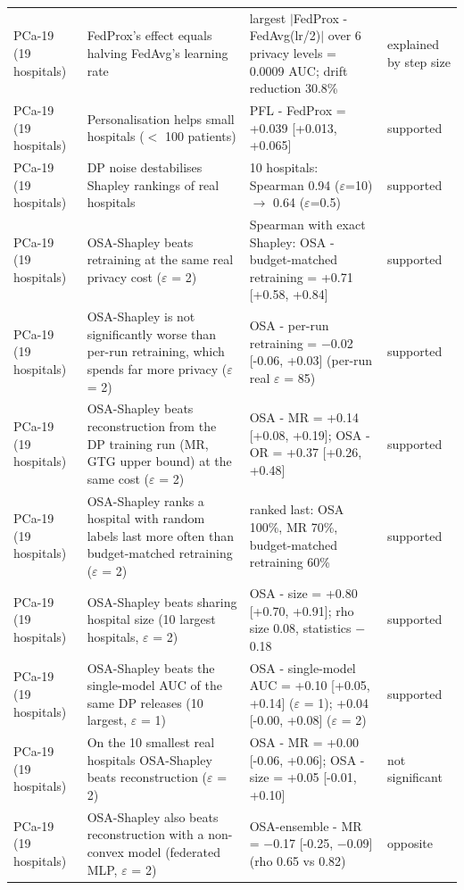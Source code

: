 \begin{table}[t]
\begin{tabular}{p{1.4cm}p{4.2cm}p{8.6cm}p{1.5cm}}
PCa-19 (19 hospitals) & FedProx's effect equals halving FedAvg's learning rate & largest $|$FedProx - FedAvg(lr/2)$|$ over 6 privacy levels = 0.0009 AUC; drift reduction 30.8\% & explained by step size \\
PCa-19 (19 hospitals) & Personalisation helps small hospitals ($<$ 100 patients) & PFL - FedProx = +0.039 {[}+0.013, +0.065{]} & supported \\
PCa-19 (19 hospitals) & DP noise destabilises Shapley rankings of real hospitals & 10 hospitals: Spearman 0.94 ($\varepsilon$=10) $\rightarrow$ 0.64 ($\varepsilon$=0.5) & supported \\
PCa-19 (19 hospitals) & OSA-Shapley beats retraining at the same real privacy cost ($\varepsilon$ = 2) & Spearman with exact Shapley: OSA - budget-matched retraining = +0.71 {[}+0.58, +0.84{]} & supported \\
PCa-19 (19 hospitals) & OSA-Shapley is not significantly worse than per-run retraining, which spends far more privacy ($\varepsilon$ = 2) & OSA - per-run retraining = \ensuremath{-}0.02 {[}-0.06, +0.03{]} (per-run real $\varepsilon$ = 85) & supported \\
PCa-19 (19 hospitals) & OSA-Shapley beats reconstruction from the DP training run (MR, GTG upper bound) at the same cost ($\varepsilon$ = 2) & OSA - MR = +0.14 {[}+0.08, +0.19{]}; OSA - OR = +0.37 {[}+0.26, +0.48{]} & supported \\
PCa-19 (19 hospitals) & OSA-Shapley ranks a hospital with random labels last more often than budget-matched retraining ($\varepsilon$ = 2) & ranked last: OSA 100\%, MR 70\%, budget-matched retraining 60\% & supported \\
PCa-19 (19 hospitals) & OSA-Shapley beats sharing hospital size (10 largest hospitals, $\varepsilon$ = 2) & OSA - size = +0.80 {[}+0.70, +0.91{]}; rho size 0.08, statistics \ensuremath{-}0.18 & supported \\
PCa-19 (19 hospitals) & OSA-Shapley beats the single-model AUC of the same DP releases (10 largest, $\varepsilon$ = 1) & OSA - single-model AUC = +0.10 {[}+0.05, +0.14{]} ($\varepsilon$ = 1); +0.04 {[}-0.00, +0.08{]} ($\varepsilon$ = 2) & supported \\
PCa-19 (19 hospitals) & On the 10 smallest real hospitals OSA-Shapley beats reconstruction ($\varepsilon$ = 2) & OSA - MR = +0.00 {[}-0.06, +0.06{]}; OSA - size = +0.05 {[}-0.01, +0.10{]} & not significant \\
PCa-19 (19 hospitals) & OSA-Shapley also beats reconstruction with a non-convex model (federated MLP, $\varepsilon$ = 2) & OSA-ensemble - MR = \ensuremath{-}0.17 {[}-0.25, \ensuremath{-}0.09{]} (rho 0.65 vs 0.82) & opposite \\

\end{tabular}
\end{table}
